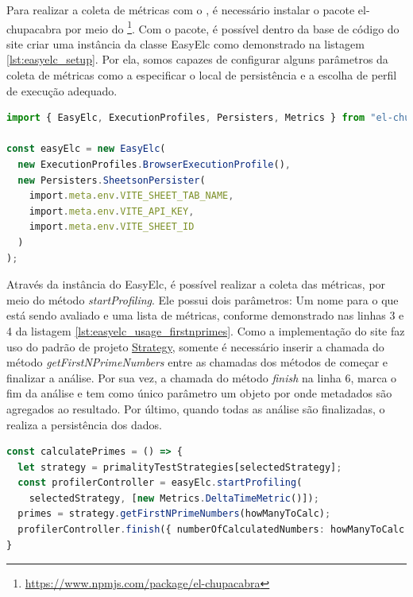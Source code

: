 \documentclass[12pt]{tcc}
\begin{document}
	Para realizar a coleta de métricas com o , é necessário instalar o pacote el-chupacabra por meio do \footnote{\url{https://www.npmjs.com/package/el-chupacabra}}.
	Com o pacote, é possível dentro da base de código do site criar uma instância da classe EasyElc como demonstrado na listagem \ref{lst:easyelc_setup}.
	Por ela, somos capazes de configurar alguns parâmetros da coleta de métricas como a especificar o local de persistência e a escolha de perfil de execução adequado.

	\begin{minipage}{\linewidth}


	\begin{lstlisting}[label={lst:easyelc_setup}, caption={Instância do módulo EasyElc no site Calculadora dos Primeiros n Números Primos.}, language=TypeScript, breaklines=true]
import { EasyElc, ExecutionProfiles, Persisters, Metrics } from "el-chupacabra"

const easyElc = new EasyElc(
  new ExecutionProfiles.BrowserExecutionProfile(),
  new Persisters.SheetsonPersister(
    import.meta.env.VITE_SHEET_TAB_NAME,
    import.meta.env.VITE_API_KEY,
    import.meta.env.VITE_SHEET_ID
  )
);
	\end{lstlisting}

	\end{minipage}

	Através da instância do EasyElc, é possível realizar a coleta das métricas, por meio do método \emph{startProfiling}.
	Ele possui dois parâmetros: Um nome para o que está sendo avaliado e uma lista de métricas, conforme demonstrado nas linhas 3 e 4 da listagem \ref{lst:easyelc_usage_firstnprimes}.
	Como a implementação do site faz uso do padrão de projeto \hyperref[subsection:strategy]{Strategy}, somente é necessário inserir a chamada do método \emph{getFirstNPrimeNumbers} entre as chamadas dos métodos de começar e finalizar a análise.
	Por sua vez, a chamada do método \emph{finish} na linha 6, marca o fim da análise e tem como único parâmetro um objeto por onde metadados são agregados ao resultado.
	Por último, quando todas as análise são finalizadas, o  realiza a persistência dos dados.

\begin{minipage}{\linewidth}
\begin{lstlisting}[label={lst:easyelc_usage_firstnprimes}, caption={Coleta de métricas usando o EasyElc no site Calculadora dos Primeiros n Números Primos.}, language=TypeScript, breaklines=true]
const calculatePrimes = () => {
  let strategy = primalityTestStrategies[selectedStrategy];
  const profilerController = easyElc.startProfiling(
    selectedStrategy, [new Metrics.DeltaTimeMetric()]);
  primes = strategy.getFirstNPrimeNumbers(howManyToCalc);
  profilerController.finish({ numberOfCalculatedNumbers: howManyToCalc });
}
\end{lstlisting}
\end{minipage}
\end{document}
